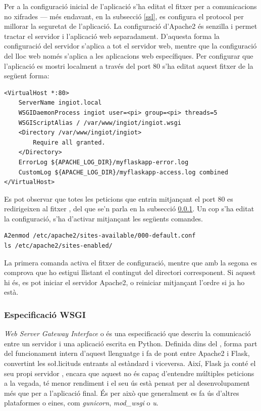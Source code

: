 \documentclass{tfgitic}[2022/06/30]
\begin{document}
Per a la configuració inicial de l'aplicació s'ha editat el fitxer  per a comunicacions no xifrades --- més endavant, en la subsecció \ref{ssl}, es configura el protocol  per millorar la seguretat de l'aplicació. La configuració d'Apache2 és senzilla i permet tractar el servidor i l'aplicació web separadament. D'aquesta forma la configuració del servidor s'aplica a tot el servidor web, mentre que la configuració del lloc web només s'aplica a les aplicacions web específiques. Per configurar que l'aplicació es mostri localment a través del port $80$ s'ha editat aquest fitxer de la següent forma:

\begin{lstlisting}[style = bash]
<VirtualHost *:80>
    ServerName ingiot.local
    WSGIDaemonProcess ingiot user=<pi> group=<pi> threads=5
    WSGIScriptAlias / /var/www/ingiot/ingiot.wsgi
    <Directory /var/www/ingiot/ingiot>
        Require all granted.
    </Directory>
    ErrorLog ${APACHE_LOG_DIR}/myflaskapp-error.log
    CustomLog ${APACHE_LOG_DIR}/myflaskapp-access.log combined
</VirtualHost>
\end{lstlisting}

Es pot observar que totes les peticions que entrin mitjançant el port $80$ es redirigeixen al fitxer , del que se'n parla en la subsecció \ref{wsgi}. Un cop s'ha editat la configuració, s'ha d'activar mitjançant les següents comandes.

\begin{lstlisting}[style = bash]
A2enmod /etc/apache2/sites-available/000-default.conf
ls /etc/apache2/sites-enabled/
\end{lstlisting}

La primera comanda activa el fitxer de configuració, mentre que amb la segona es comprova que ho estigui llistant el contingut del directori corresponent. Si aquest hi és, es pot iniciar el servidor Apache2, o reiniciar mitjançant l'ordre  si ja ho està.


\subsubsection{Especificació WSGI}
\label{wsgi}
\emph{Web Server Gateway Interface} o  és una especificació que descriu la comunicació entre un servidor i una aplicació escrita en Python. Definida dins del  \cite{python:pepWsgi}, forma part del funcionament intern d'aquest llenguatge i fa de pont entre Apache2 i Flask, convertint les so\l.licituds  entrants al estàndard  i viceversa. Així, Flask ja conté el seu propi servidor , encara que aquest no és capaç d'entendre múltiples peticions a la vegada, té menor rendiment i el seu ús està pensat per al desenvolupament més que per a l'aplicació final. És per això que generalment es fa ús d'altres plataformes o eines, com \emph{gunicorn}, \emph{mod\_wsgi} o \emph{u}.
\end{document}

